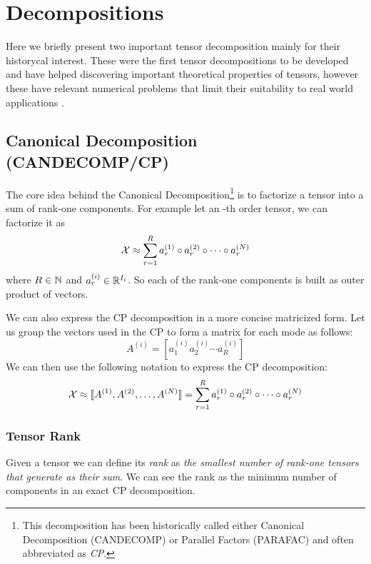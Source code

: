 \chapter{Decompositions}
Here we briefly present two important tensor decomposition mainly for their historycal interest. These were the first tensor decompositions to be developed and have helped discovering important theoretical properties of tensors, however these have relevant numerical problems that limit their suitability to real world applications \cite{tensorreview}.

\section{Canonical Decomposition (CANDECOMP/CP)}
The core idea behind the Canonical Decomposition\footnote{This decomposition has been historically called either Canonical Decomposition (CANDECOMP) or Parallel Factors (PARAFAC) and often abbreviated as \emph{CP}.} is to factorize a tensor into a sum of rank-one components. For example let \X an \N-th order tensor, we can factorize it as
\begin{equation}
  \mathcal{X} \approx \sum_{r = 1}^R a_r^{(1)} \circ a_r^{(2)} \circ \cdots \circ a_r^{(N)}
\end{equation}
where $R \in \mathbb{N}$ and $a_r^{(i)} \in \mathbb{R}^{I_i}$. So each of the rank-one components is built as outer product of \N vectors.

We can also express the CP decomposition in a more concise matricized form.
Let us group the vectors used in the CP to form a matrix for each mode  as follows:
\begin{equation*}
  A^{(i)} = [ a^{(i)}_1 a^{(i)}_2 \cdots a^{(i)}_R ]
\end{equation*}
We can then use the following notation to express the CP decomposition:
\begin{equation*}
  \mathcal{X} \approx \llbracket A^{(1)}, A^{(2)}, \ldots, A^{(N)} \rrbracket = \sum_{r = 1}^R a_r^{(1)} \circ a_r^{(2)} \circ \cdots \circ a_r^{(N)}
\end{equation*}

\subsection{Tensor Rank}
Given a tensor \X we can define its \emph{rank} as \emph{the smallest number of rank-one tensors that generate \X as their sum}. We can see the rank as the minimum number of components in an exact CP decomposition.


